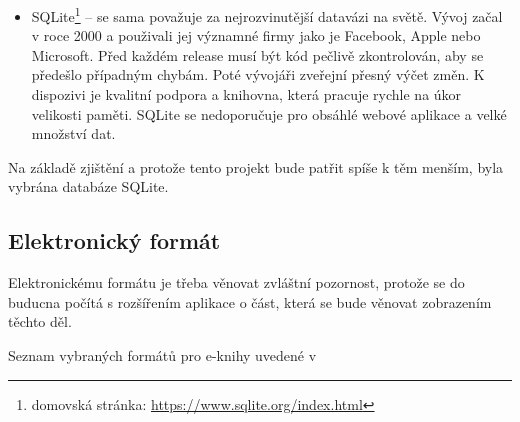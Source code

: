 \begin{itemize}
                \item SQLite\footnote{domovská stránka: \url{https://www.sqlite.org/index.html}} – se sama považuje za nejrozvinutější datavázi na světě. Vývoj začal v roce 2000 a použivali jej významné firmy jako je Facebook, Apple nebo Microsoft. Před každém release musí být kód pečlivě zkontrolován, aby se předešlo případným chybám. Poté vývojáři zveřejní přesný výčet změn. K dispozivi je kvalitní podpora a knihovna, která pracuje rychle na úkor velikosti paměti. SQLite se nedoporučuje pro obsáhlé webové aplikace a velké množství dat.
        \end{itemize}
        
        Na základě zjištění a protože tento projekt bude patřit spíše k těm menším, byla vybrána databáze SQLite.
        
        \subsection{Elektronický formát}
            \cite{electronic-format}
            
            Elektronickému formátu je třeba věnovat zvláštní pozornost, protože se do buducna počítá s rozšířením aplikace o část, která se bude věnovat zobrazením těchto děl.
            
            Seznam vybraných formátů pro e-knihy uvedené v \cite{electronic-format}
            
